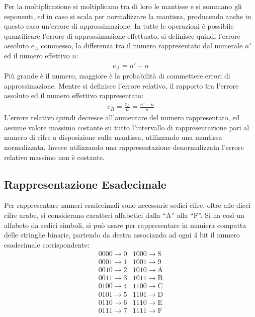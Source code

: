 \documentclass{article}
\numberwithin{equation}{subsection}
\begin{document}
Per la moltiplicazione si moltiplicano tra di loro le mantisse e si sommano gli esponenti, ed in caso si scala per normalizzare la mantissa, producendo anche in questo caso un'errore di approssimazione. 
In tutte le operazioni è possibile quantificare l'errore di approssimazione effettuato, si definisce quindi l'errore assoluto $e_A$ commesso, la differenza tra il numero rappresentato dal numerale $n'$ ed il numero effettivo 
$n$: 
\begin{gather*}
    e_A=n'-n
\end{gather*}
Più grande è il numero, maggiore è la probabilità di commettere errori di approssimazione. Mentre si definisce l'errore relativo, il rapporto tra l'errore assoluto ed il numero effettivo rappresentato:
\begin{gather*}
    e_R=\displaystyle\frac{e_A}{n}=\frac{n'-n}{n}
\end{gather*}
L'errore relativo quindi decresce all'aumentare del numero rappresentato, ed assume valore massimo costante su tutto l'intervallo di rappresentazione pari al numero di cifre a disposizione sulla mantissa, utilizzando 
una mantissa normalizzata. Invece utilizzando una rappresentazione denormalizzata l'errore relativo massimo non è costante. 

\subsection{Rappresentazione Esadecimale}

Per rappresentare numeri esadecimali sono necessarie sedici cifre, oltre alle dieci cifre arabe, si considerano caratteri alfabetici dalla ``A'' alla ``F''. Si ha così un alfabeto da sedici simboli, si può usare 
per rappresentare in maniera compatta delle stringhe binarie, partendo da destra associando ad ogni 4 bit il numero esadecimale corrispondente:
\begin{align*}
    &0000\to 0& 1000\to8&\\
    &0001 \to 1&1001\to9&\\
    &0010\to2&1010\to\mathrm{A}&\\
    &0011\to3&1011\to\mathrm{B}&\\
    &0100\to4&1100\to\mathrm{C}&\\
    &0101\to5&1101\to\mathrm{D}&\\
    &0110\to6&1110\to\mathrm{E}&\\
    &0111\to7&1111\to \mathrm{F}&
\end{align*}
\end{document}
